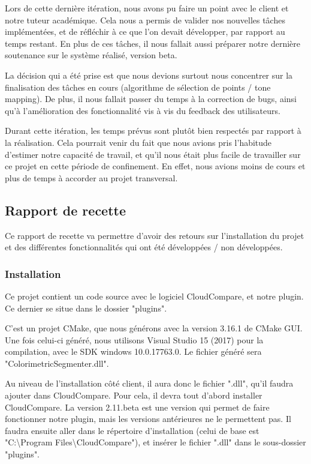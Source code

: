 \documentclass[12pt,titlepage,french]{article}
\begin{document}
Lors de cette dernière itération, nous avons pu faire un point avec le client et notre tuteur académique. Cela nous a permis de valider nos nouvelles tâches implémentées, et de réfléchir à ce que l'on devait développer, par rapport au temps restant. En plus de ces tâches, il nous fallait aussi préparer notre dernière soutenance sur le système réalisé, version beta. \newline

La décision qui a été prise est que nous devions surtout nous concentrer sur la finalisation des tâches en cours (algorithme de sélection de points / tone mapping). De plus, il nous fallait passer du temps à la correction de bugs, ainsi qu'à l'amélioration des fonctionnalité vis à vis du feedback des utilisateurs. \newline

Durant cette itération, les temps prévus sont plutôt bien respectés par rapport à la réalisation. Cela pourrait venir du fait que nous avions pris l'habitude d'estimer notre capacité de travail, et qu'il nous était plus facile de travailler sur ce projet en cette période de confinement. En effet, nous avions moins de cours et plus de temps à accorder au projet transversal.

\subsection{Rapport de recette}

Ce rapport de recette va permettre d'avoir des retours sur l'installation du projet et des différentes fonctionnalités qui ont été développées / non développées.

\subsubsection {Installation}

Ce projet contient un code source avec le logiciel CloudCompare, et notre plugin. Ce dernier se situe dans le dossier "plugins". \newline

C'est un projet CMake, que nous générons avec la version 3.16.1 de CMake GUI. Une fois celui-ci généré, nous utilisons Visual Studio 15 (2017) pour la compilation, avec le SDK windows 10.0.17763.0. Le fichier généré sera "ColorimetricSegmenter.dll".\newline

Au niveau de l'installation côté client, il aura donc le fichier ".dll", qu'il faudra ajouter dans CloudCompare. Pour cela, il devra tout d'abord installer CloudCompare. La version 2.11.beta est une version qui permet de faire fonctionner notre plugin, mais les versions antérieures ne le permettent pas. Il faudra ensuite aller dans le répertoire d'installation (celui de base est "C:\textbackslash Program Files\textbackslash CloudCompare"), et insérer le fichier ".dll" dans le sous-dossier "plugins". \newline
\end{document}
